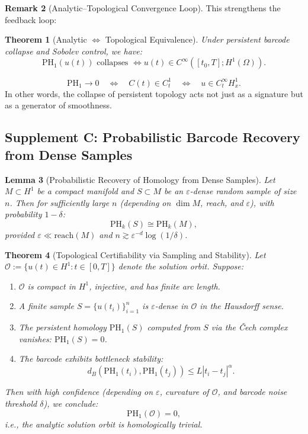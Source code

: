 \documentclass[11pt]{article}
\newtheorem{theorem}{Theorem}[section]
\newtheorem{lemma}[theorem]{Lemma}
\theoremstyle{definition}
\newtheorem{remark}[theorem]{Remark}
\begin{document}
\begin{remark}[Analytic–Topological Convergence Loop]
This strengthens the feedback loop:

\begin{theorem}[Analytic $\Leftrightarrow$ Topological Equivalence]
Under persistent barcode collapse and Sobolev control, we have:
\[
\mathrm{PH}_1(u(t)) \text{ collapses } \Longleftrightarrow u(t) \in C^\infty([t_0,T]; H^1(\Omega)).
\]
\end{theorem}
        \[
\mathrm{PH}_1 \to 0 \quad \Longleftrightarrow \quad C(t) \in C^1_t \quad \Longleftrightarrow \quad u \in C^\infty_t H^1_x.
\]
In other words, the collapse of persistent topology acts not just as a signature but as a generator of smoothness.
\end{remark}

\subsection{Supplement C: Probabilistic Barcode Recovery from Dense Samples}

\begin{lemma}[Probabilistic Recovery of Homology from Dense Samples]
Let $M \subset H^1$ be a compact manifold and $S \subset M$ be an $\varepsilon$-dense random sample of size $n$. Then for sufficiently large $n$ (depending on $\dim M$, reach, and $\varepsilon$), with probability $1 - \delta$:
\[
\mathrm{PH}_k(S) \cong \mathrm{PH}_k(M),
\]
provided $\varepsilon \ll \text{reach}(M)$ and $n \gtrsim \varepsilon^{-d} \log(1/\delta)$.
\end{lemma}

\begin{theorem}[Topological Certifiability via Sampling and Stability]
\label{thm:certifiability}
Let $\mathcal{O} := \{ u(t) \in H^1 : t \in [0,T] \}$ denote the solution orbit. Suppose:
\begin{enumerate}
    \item $\mathcal{O}$ is compact in $H^1$, injective, and has finite arc length.
    \item A finite sample $S = \{ u(t_i) \}_{i=1}^n$ is $\varepsilon$-dense in $\mathcal{O}$ in the Hausdorff sense.
    \item The persistent homology $\mathrm{PH}_1(S)$ computed from $S$ via the Čech complex vanishes: $\mathrm{PH}_1(S) = 0$.
    \item The barcode exhibits bottleneck stability:
    \[
    d_B(\mathrm{PH}_1(t_i), \mathrm{PH}_1(t_j)) \leq L|t_i - t_j|^\alpha.
    \]
\end{enumerate}
Then with high confidence (depending on $\varepsilon$, curvature of $\mathcal{O}$, and barcode noise threshold $\delta$), we conclude:
\[
\mathrm{PH}_1(\mathcal{O}) = 0,
\]
i.e., the analytic solution orbit is homologically trivial.
\end{theorem}
\end{document}
